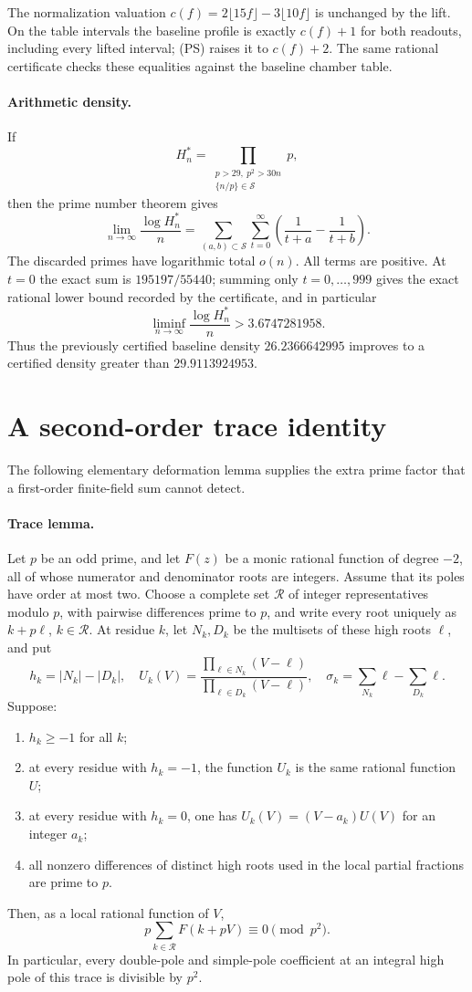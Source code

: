 \documentclass[11pt]{article}
\begin{document}
The normalization valuation
$c(f)=2\lfloor15f\rfloor-3\lfloor10f\rfloor$ is unchanged by the lift.
On the table intervals the baseline profile is exactly $c(f)+1$ for both
readouts, including every lifted interval; (PS) raises it to $c(f)+2$.
The same rational certificate checks these equalities against the
baseline chamber table.

\paragraph{Arithmetic density.}
If
\[
 H_n^*=\prod_{\substack{p>29,\ p^2>30n\\\{n/p\}\in\mathcal S}}p,
\]
then the prime number theorem gives
\[
 \lim_{n\to\infty}\frac{\log H_n^*}{n}
 =\sum_{(a,b)\subset\mathcal S}\sum_{t=0}^{\infty}
      \left(\frac1{t+a}-\frac1{t+b}\right).
\]
The discarded primes have logarithmic total $o(n)$.  All terms are
positive.  At $t=0$ the exact sum is $195197/55440$; summing only
$t=0,\ldots,999$ gives the exact rational lower bound recorded by the
certificate, and in particular
\[
 \liminf_{n\to\infty}\frac{\log H_n^*}{n}
       >3.6747281958.
\]
Thus the previously certified baseline density $26.2366642995$ improves
to a certified density greater than $29.9113924953$.


\section{A second-order trace identity}
The following elementary deformation lemma supplies the extra prime
factor that a first-order finite-field sum cannot detect.

\paragraph{Trace lemma.}
Let $p$ be an odd prime, and let $F(z)$ be a monic rational function of
degree $-2$, all of whose numerator and denominator roots are integers.
Assume that its poles have order at most two.  Choose a complete set
$\mathcal R$ of integer representatives modulo $p$, with pairwise
differences prime to $p$, and write every root uniquely as $k+p\ell$,
$k\in\mathcal R$.  At residue $k$, let $N_k,D_k$ be the multisets of these
high roots $\ell$, and put
\[
 h_k=|N_k|-|D_k|,\quad
 U_k(V)=\frac{\prod_{\ell\in N_k}(V-\ell)}
                  {\prod_{\ell\in D_k}(V-\ell)},\quad
 \sigma_k=\sum_{N_k}\ell-\sum_{D_k}\ell.
\]
Suppose:
\begin{enumerate}
\item $h_k\ge-1$ for all $k$;
\item at every residue with $h_k=-1$, the function $U_k$ is the same
      rational function $U$;
\item at every residue with $h_k=0$, one has $U_k(V)=(V-a_k)U(V)$ for an
      integer $a_k$;
\item all nonzero differences of distinct high roots used in the local
      partial fractions are prime to $p$.
\end{enumerate}
Then, as a local rational function of $V$,
\[
       p\sum_{k\in\mathcal R}F(k+pV)\equiv0\pmod {p^2}.       \tag{T2}
\]
In particular, every double-pole and simple-pole coefficient at an
integral high pole of this trace is divisible by $p^2$.
\end{document}
